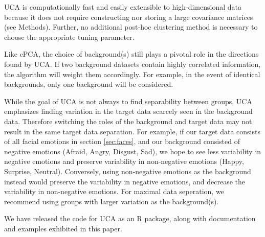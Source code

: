 \documentclass[12pt]{article}
\begin{document}
UCA is computationally fast and easily extensible to high-dimensional data because it does not require constructing nor storing a large covariance matrices (see Methods). Further, no additional post-hoc clustering method is necessary to choose the appropriate tuning parameter.

Like cPCA, the choice of background(s) still plays a pivotal role in the directions found by UCA. If two background datasets contain highly correlated information, the algorithm will weight them accordingly. For example, in the event of identical backgrounds, only one background will be considered.

While the goal of UCA is not always to find separability between groups, UCA emphasizes finding variation in the target data scarcely seen in the background data. Therefore switching the roles of the background and target data may not result in the same target data separation. For example, if our target data consists of all facial emotions in section \ref{sec:faces}, and our background consisted of negative emotions (Afraid, Angry, Disgust, Sad), we hope to see less variability in negative emotions and preserve variability in non-negative emotions (Happy, Surprise, Neutral).
Conversely, using non-negative emotions as the background instead would preserve the variability in negative emotions, and decrease the variability in non-negative emotions. For maximal data seperation, we recommend using groups with larger variation as the background(s).

We have released the code for UCA as an R package, along with documentation and examples exhibited in this paper. 
\end{document}
